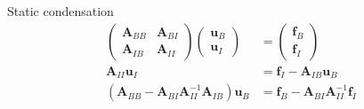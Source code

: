 \documentclass{sintefbeamer}
\begin{document}
\begin{frame}{Static condensation}
    \begin{align*}
        \begin{pmatrix}
            \mathbf A_{BB} & \mathbf A_{BI} \\
            \mathbf A_{IB} & \mathbf A_{II}
        \end{pmatrix}
        \begin{pmatrix}
            \mathbf u_B \\ \mathbf u_I
        \end{pmatrix}
        &=
        \begin{pmatrix}
            \mathbf f_B \\ \mathbf f_I
        \end{pmatrix} \\[5mm]
        \mathbf A_{II} \mathbf u_I &= \mathbf f_I - \mathbf A_{IB} \mathbf u_B \\[2mm]
        (\mathbf A_{BB} - \mathbf A_{BI} \mathbf A_{II}^{-1} \mathbf A_{IB}) \mathbf u_B
            &= \mathbf f_B - \mathbf A_{BI} \mathbf A_{II}^{-1} \mathbf f_I
    \end{align*}
\end{frame}
\end{document}
